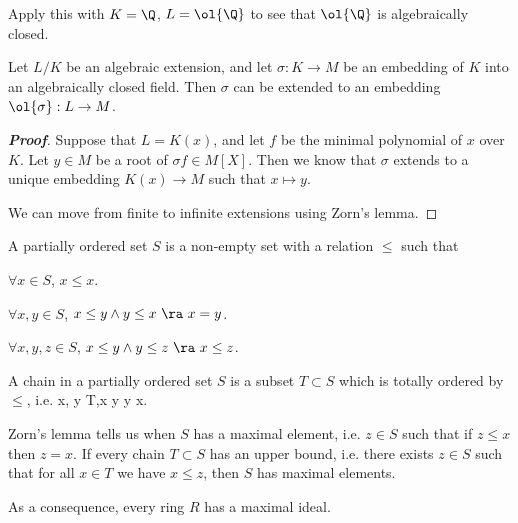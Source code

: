Apply this with $K = \Q$, $L = \ol{\Q}$ to see that $\ol{\Q}$ is algebraically closed.



\begin{proposition}
Let $L/K$ be an algebraic extension, and let $\sigma : K \to M$ be an embedding of $K$ into an algebraically closed field. Then $\sigma$ can be extended to an embedding $\ol{\sigma} : L \to M$.
\end{proposition}

\begin{proof}[\bf Proof]
Suppose that $L = K(x)$, and let $f$ be the minimal polynomial of $x$ over $K$. Let $y \in M$ be a root of $\sigma f \in M[X]$. Then we know that $\sigma$ extends to a unique embedding $K(x) \to M$ such that $x \mapsto y$.

We can move from finite to infinite extensions using Zorn's lemma.
\end{proof}

\begin{definition}
A partially ordered set $S$ is a non-empty set with a relation $\leq$ such that
\bit
\item $\forall x \in S$, $x \leq x$.
\item $\forall x, y \in S$, $x \leq  y \land y \leq  x \ \ra \ x = y$.
\item $\forall x, y, z \in S$, $x \leq  y \land y \leq z \ \ra \ x \leq z$.
\eit
\end{definition}

\begin{definition}
A chain in a partially ordered set $S$ is a subset $T \subset S$ which is totally ordered by $\leq$, i.e.
\be
\forall x, y \in T,\quad  x \leq  y \vee y \leq x.
\ee
\end{definition}

Zorn's lemma tells us when $S$ has a maximal element, i.e. $z \in S$ such that if $z \leq x$ then $z = x$. If every chain $T \subset S$ has an upper bound, i.e. there exists $z \in S$ such that for all $x \in T$ we have $x \leq z$, then $S$ has maximal elements.

As a consequence, every ring $R$ has a maximal ideal.

